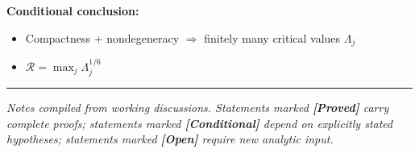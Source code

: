 \documentclass[12pt]{article}
\theoremstyle{definition}
\theoremstyle{remark}
\newcommand{\proven}{\textbf{\color{teal}[Proved]}}
\newcommand{\conditional}{\textbf{\color{orange}[Conditional]}}
\newcommand{\open}{\textbf{\color{red}[Open]}}
\begin{document}
\begin{center}
{{\textbf{Conditional conclusion:}
\begin{itemize}[leftmargin=1.5em, topsep=2pt, itemsep=1pt]
  \item Compactness + nondegeneracy $\Longrightarrow$ finitely many
    critical values $\Lambda_j$
  \item $\mathcal R=\max_j\Lambda_j^{1/6}$
\end{itemize}
}}
\end{center}

\bigskip
\noindent\rule{\linewidth}{0.4pt}
\begin{center}
  \small\itshape
  Notes compiled from working discussions.  Statements marked \proven{}
  carry complete proofs; statements marked \conditional{} depend on
  explicitly stated hypotheses; statements marked \open{} require new
  analytic input.
\end{center}
\end{document}
